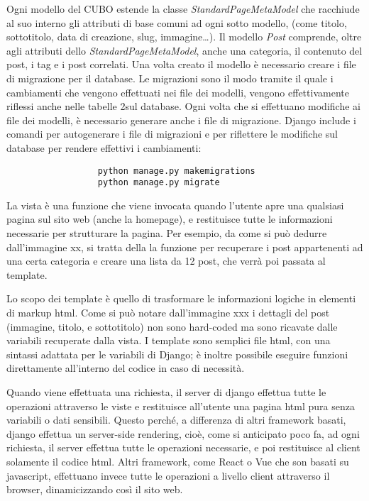 \documentclass[12pt,a4paper]{article}
\begin{document}
Ogni modello del CUBO estende la classe \textit{StandardPageMetaModel} che racchiude al suo interno gli attributi di base comuni ad ogni sotto modello, (come titolo, sottotitolo, data di creazione, slug, immagine…).
Il modello \textit{Post} comprende, oltre agli attributi dello \textit{StandardPageMetaModel}, anche una categoria, il contenuto del post, i tag e i post correlati.
Una volta creato il modello è necessario creare i file di migrazione per il database.
Le migrazioni sono il modo tramite il quale i cambiamenti che vengono effettuati nei file dei modelli, vengono effettivamente riflessi anche nelle tabelle 2sul database.
Ogni volta che si effettuano modifiche ai file dei modelli, è necessario generare anche i file di migrazione. Django include i comandi per autogenerare i file di migrazioni e per riflettere le modifiche sul database per rendere effettivi i  cambiamenti:
\begin{verbatim}
                  python manage.py makemigrations
                  python manage.py migrate
\end{verbatim}
La vista è una funzione che viene invocata quando l’utente apre una qualsiasi pagina sul sito web (anche la homepage), e restituisce tutte le informazioni necessarie per strutturare la pagina.
Per esempio, da come si può dedurre dall’immagine xx, si tratta della la funzione per recuperare i post appartenenti ad una certa categoria e creare una lista da 12 post, che verrà poi passata al template.

Lo scopo dei template è quello di trasformare le informazioni logiche in elementi di markup html. Come si può notare dall’immagine xxx i dettagli del post (immagine, titolo, e sottotitolo) non sono hard-coded ma sono ricavate dalle variabili recuperate dalla vista.
I template sono semplici file html, con una sintassi adattata per le variabili di Django; è inoltre possibile eseguire funzioni direttamente all’interno del codice in caso di necessità.

Quando viene effettuata una richiesta, il server di django effettua tutte le operazioni attraverso le viste e restituisce all’utente una pagina html pura senza variabili o dati sensibili. Questo perché, a differenza di altri framework basati, django effettua un server-side rendering, cioè, come si anticipato poco fa, ad ogni richiesta, il server effettua tutte le operazioni necessarie, e poi restituisce al client solamente il codice html.
Altri framework, come React o Vue che son basati su javascript, effettuano invece tutte le operazioni a livello client attraverso il browser, dinamicizzando così il sito web.
\end{document}
